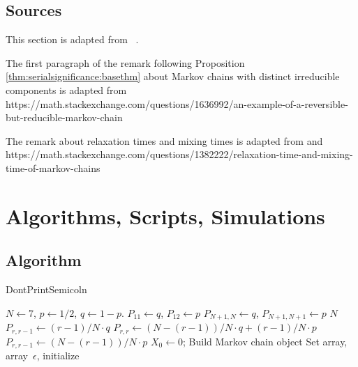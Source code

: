 \documentclass[12pt]{article}
\begin{document}
\begin{example}
\subsection*{Sources} This section is adapted from~%
\cite{Chikina2860, Chikina2019, doi:10.1080/2330443X.2020.1806763}.

The first paragraph of the remark following Proposition~%
\ref{thm:serialsignificance:basethm} about Markov chains with distinct
irreducible components is adapted from
https://math.stackexchange.com/questions/1636992/an-example-of-a-reversible-but-reducible-markov-chain

The remark about relaxation times and mixing times is adapted from%
\cite{levin09} and
https://math.stackexchange.com/questions/1382222/relaxation-time-and-mixing-time-of-markov-chains

\hr

\section*{Algorithms, Scripts, Simulations}

\subsection*{Algorithm}

\begin{algorithm}[H]
    DontPrintSemicoln  
      
     
     

     \BlankLine \( N \leftarrow 7 \), \( p \leftarrow 1/2 \),
    \( q \leftarrow 1-p \).\;  \( P_{11} \leftarrow q \), \( P_{12}
    \leftarrow p \)\; \( P_{N+1,N} \leftarrow q \), \( P_{N+1, N+1}
    \leftarrow p \)\;  \KwTo \( N \){ \( P_{r,r-1}
    \leftarrow (r-1)/N \cdot q \)\; \( P_{r,r} \leftarrow (N-(r-1))/N
    \cdot q + (r-1)/N \cdot p \)\; \( P_{r,r-1} \leftarrow (N-(r-1))/N
    \cdot p \)\; }  \( X_0
    \leftarrow 0 \); Build Markov chain object\; \BlankLine Set \pL
    array, \nT array\, \( \epsilon \), initialize \res


\end{algorithm}
\end{example}
\end{document}
